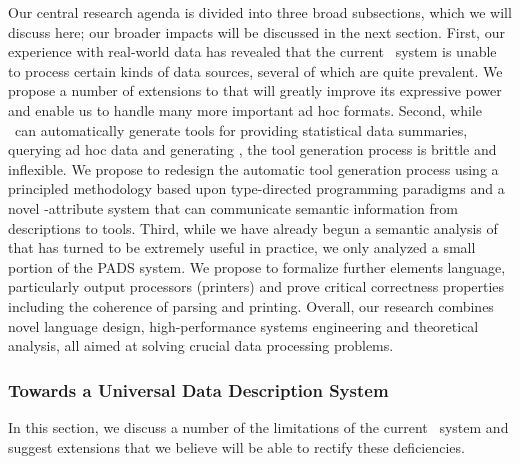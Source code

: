 \documentclass[11pt]{article}
\begin{document}
Our central research agenda is divided into three broad subsections,
which we will discuss here; our broader impacts will be discussed in the next 
section.  First, our experience with real-world data has revealed that
the current \pads{}\ system is unable to process certain kinds of
data sources, several of which are quite prevalent.  We 
propose a number of extensions to \pads{} 
that will greatly improve its expressive power and enable
us to handle many more important ad hoc formats.  Second,
while \pads{}\ can automatically generate tools for providing
statistical data summaries, querying ad hoc data and generating
\xml, the tool generation process is brittle and inflexible.  We 
propose to redesign
the automatic tool generation process using a principled methodology
based upon type-directed programming paradigms and
a novel \pads{}-attribute system that can communicate
semantic information from descriptions to tools.  
Third, while we have already begun a
semantic analysis of \pads{} that has turned to be extremely useful in 
practice, we only analyzed a small portion of the PADS system.  
We propose to formalize further elements language, particularly
output processors (printers) and prove critical \pads{} correctness
properties including the coherence of parsing and printing.  
Overall, our research combines novel language
design, high-performance systems engineering and theoretical analysis,
all aimed at solving crucial data processing problems.

\subsubsection{Towards a Universal Data Description System}

In this
section, we discuss a number of the limitations of the current \pads{}\ 
system and suggest extensions that we believe will be able to rectify
these deficiencies.  
\end{document}
